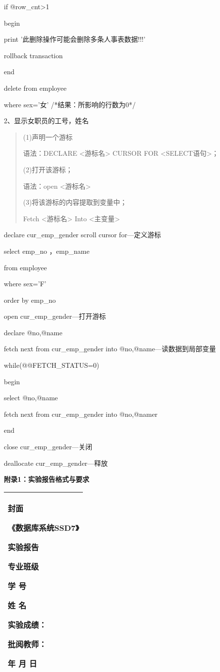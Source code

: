 \documentclass[
]{article}
\begin{document}
if @row\_cnt\textgreater1

begin

print '此删除操作可能会删除多条人事表数据!!!'

rollback transaction

end

delete from employee

where sex='女' /*结果：所影响的行数为0*/

2、显示女职员的工号，姓名

\begin{quote}
(1)声明一个游标

语法：DECLARE \textless 游标名\textgreater{} CURSOR FOR
\textless SELECT语句\textgreater；

(2)打开该游标；

语法：open \textless 游标名\textgreater{}

(3)将该游标的内容提取到变量中；

Fetch \textless 游标名\textgreater{} Into \textless 主变量\textgreater{}
\end{quote}

declare cur\_emp\_gender scroll cursor for---定义游标

select emp\_no ，emp\_name

from employee

where sex='F'

order by emp\_no

open cur\_emp\_gender---打开游标

declare @no,@name

fetch next from cur\_emp\_gender into @no,@name---读数据到局部变量

while(@@FETCH\_STATUS=0)

begin

select @no,@name

fetch next from cur\_emp\_gender into @no,@namer

end

close cur\_emp\_gender---关闭

deallocate cur\_emp\_gender---释放

\textbf{附录1：实验报告格式与要求}

\begin{longtable}[]{@{}l@{}}
\toprule
\endhead
\begin{minipage}[t]{0.97\columnwidth}\raggedright
\textbf{封面}

\textbf{《数据库系统SSD7》}

\textbf{实验报告}

专业班级 { }

学 号 { }

姓 名 { }

{}

\textbf{实验成绩：}

\textbf{批阅教师：}

年 月 日\strut
\end{minipage}\tabularnewline
\bottomrule
\end{longtable}
\end{document}
